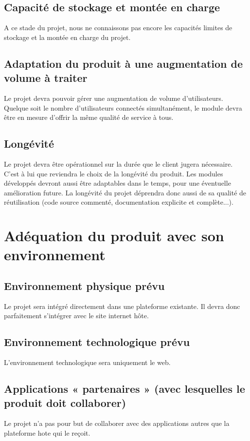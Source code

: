 		\subsection{Capacité de stockage et montée en charge}
		A ce stade du projet, nous ne connaissons pas encore les capacités limites de stockage et la montée en charge du projet. 
	
		\subsection{Adaptation du produit à une augmentation de volume à traiter}
		Le projet devra pouvoir gérer une augmentation de volume d'utilisateurs. Quelque soit le nombre d'utilisateurs connectés simultanément, le module devra être en mesure d'offrir la même qualité de service à tous.  
	
		\subsection{Longévité}
		Le projet devra être opérationnel sur la durée que le client jugera nécessaire. C'est à lui que reviendra le choix de la longévité du produit. Les modules développés devront aussi être adaptables dans le temps, pour une éventuelle amélioration future. La longévité du projet déprendra donc aussi de sa qualité de réutilisation (code source commenté, documentation explicite et complète...).
	
	\section{Adéquation du produit avec son environnement}
		\subsection{Environnement physique prévu}
		Le projet sera intégré directement dans une plateforme existante. Il devra donc parfaitement s'intégrer avec le site internet hôte.
	
		\subsection{Environnement technologique prévu}	
		L'environnement technologique sera uniquement le web. 
	
		\subsection{Applications « partenaires » (avec lesquelles le produit doit collaborer)}
		Le projet n'a pas pour but de collaborer avec des applications autres que la plateforme hote qui le reçoit. 
	
